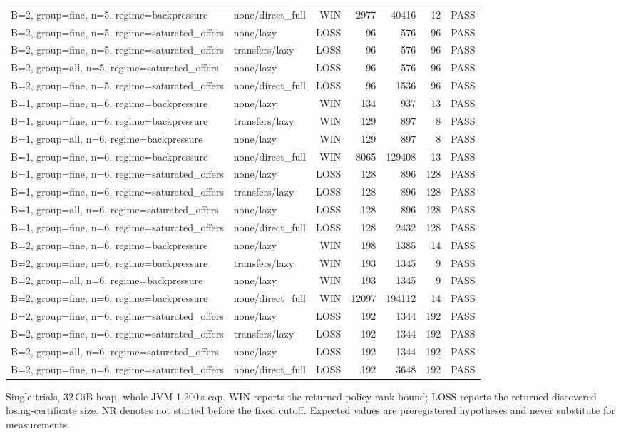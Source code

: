 \begin{longtable}{llrrrrl}
B=2, group=fine, n=5, regime=backpressure & none/direct\_full & WIN & 2977 & 40416 & 12 & PASS \\
B=2, group=fine, n=5, regime=saturated\_offers & none/lazy & LOSS & 96 & 576 & 96 & PASS \\
B=2, group=fine, n=5, regime=saturated\_offers & transfers/lazy & LOSS & 96 & 576 & 96 & PASS \\
B=2, group=all, n=5, regime=saturated\_offers & none/lazy & LOSS & 96 & 576 & 96 & PASS \\
B=2, group=fine, n=5, regime=saturated\_offers & none/direct\_full & LOSS & 96 & 1536 & 96 & PASS \\
B=1, group=fine, n=6, regime=backpressure & none/lazy & WIN & 134 & 937 & 13 & PASS \\
B=1, group=fine, n=6, regime=backpressure & transfers/lazy & WIN & 129 & 897 & 8 & PASS \\
B=1, group=all, n=6, regime=backpressure & none/lazy & WIN & 129 & 897 & 8 & PASS \\
B=1, group=fine, n=6, regime=backpressure & none/direct\_full & WIN & 8065 & 129408 & 13 & PASS \\
B=1, group=fine, n=6, regime=saturated\_offers & none/lazy & LOSS & 128 & 896 & 128 & PASS \\
B=1, group=fine, n=6, regime=saturated\_offers & transfers/lazy & LOSS & 128 & 896 & 128 & PASS \\
B=1, group=all, n=6, regime=saturated\_offers & none/lazy & LOSS & 128 & 896 & 128 & PASS \\
B=1, group=fine, n=6, regime=saturated\_offers & none/direct\_full & LOSS & 128 & 2432 & 128 & PASS \\
B=2, group=fine, n=6, regime=backpressure & none/lazy & WIN & 198 & 1385 & 14 & PASS \\
B=2, group=fine, n=6, regime=backpressure & transfers/lazy & WIN & 193 & 1345 & 9 & PASS \\
B=2, group=all, n=6, regime=backpressure & none/lazy & WIN & 193 & 1345 & 9 & PASS \\
B=2, group=fine, n=6, regime=backpressure & none/direct\_full & WIN & 12097 & 194112 & 14 & PASS \\
B=2, group=fine, n=6, regime=saturated\_offers & none/lazy & LOSS & 192 & 1344 & 192 & PASS \\
B=2, group=fine, n=6, regime=saturated\_offers & transfers/lazy & LOSS & 192 & 1344 & 192 & PASS \\
B=2, group=all, n=6, regime=saturated\_offers & none/lazy & LOSS & 192 & 1344 & 192 & PASS \\
B=2, group=fine, n=6, regime=saturated\_offers & none/direct\_full & LOSS & 192 & 3648 & 192 & PASS \\
\bottomrule
\end{longtable}
{\par\smallskip\footnotesize Single trials, 32\,GiB heap, whole-JVM 1,200\,s cap. WIN reports the returned policy rank bound; LOSS reports the returned discovered losing-certificate size. NR denotes not started before the fixed cutoff. Expected values are preregistered hypotheses and never substitute for measurements.}
